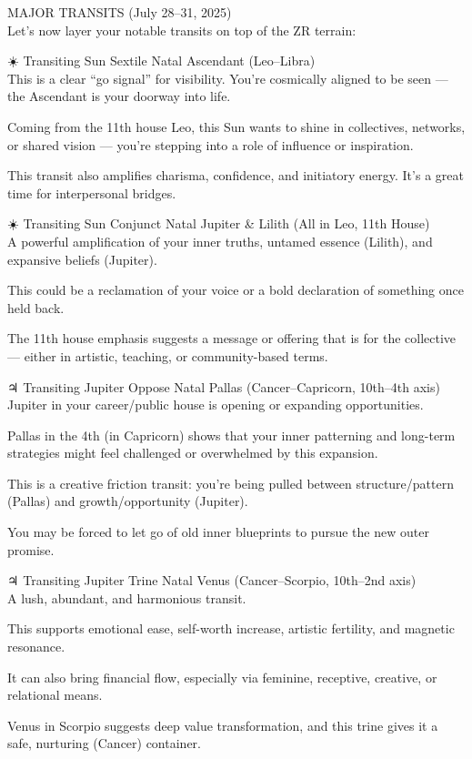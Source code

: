 \documentclass{article}
\begin{document}
 MAJOR TRANSITS (July 28--31, 2025)\\
Let's now layer your notable transits on top of the ZR terrain:

☀️ Transiting Sun Sextile Natal Ascendant (Leo--Libra)\\
This is a clear ``go signal'' for visibility. You're cosmically aligned
to be seen --- the Ascendant is your doorway into life.

Coming from the 11th house Leo, this Sun wants to shine in collectives,
networks, or shared vision --- you're stepping into a role of influence
or inspiration.

This transit also amplifies charisma, confidence, and initiatory energy.
It's a great time for interpersonal bridges.

☀️ Transiting Sun Conjunct Natal Jupiter \& Lilith (All in Leo, 11th
House)\\
A powerful amplification of your inner truths, untamed essence (Lilith),
and expansive beliefs (Jupiter).

This could be a reclamation of your voice or a bold declaration of
something once held back.

The 11th house emphasis suggests a message or offering that is for the
collective --- either in artistic, teaching, or community-based terms.

♃ Transiting Jupiter Oppose Natal Pallas (Cancer--Capricorn, 10th--4th
axis)\\
Jupiter in your career/public house is opening or expanding
opportunities.

Pallas in the 4th (in Capricorn) shows that your inner patterning and
long-term strategies might feel challenged or overwhelmed by this
expansion.

This is a creative friction transit: you're being pulled between
structure/pattern (Pallas) and growth/opportunity (Jupiter).

You may be forced to let go of old inner blueprints to pursue the new
outer promise.

♃ Transiting Jupiter Trine Natal Venus (Cancer--Scorpio, 10th--2nd
axis)\\
A lush, abundant, and harmonious transit.

This supports emotional ease, self-worth increase, artistic fertility,
and magnetic resonance.

It can also bring financial flow, especially via feminine, receptive,
creative, or relational means.

Venus in Scorpio suggests deep value transformation, and this trine
gives it a safe, nurturing (Cancer) container.
\end{document}
